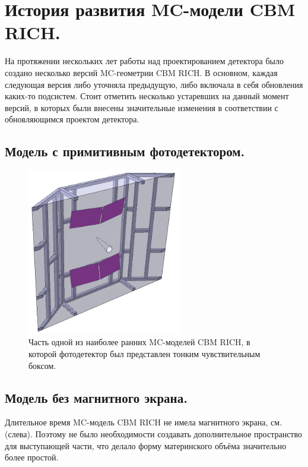 
\section{История развития MC-модели CBM RICH.}

На протяжении нескольких лет работы над проектированием детектора было создано несколько версий MC-геометрии CBM RICH. В основном, каждая следующая версия либо уточняла предыдущую, либо включала в себя обновления каких-то подсистем. Стоит отметить несколько устаревших на данный момент версий, в которых были внесены значительные изменения в соответствии с обновляющимся проектом детектора.

\subsection{Модель с примитивным фотодетектором.}

\begin{figure}[H]
\centering
\includegraphics[width=0.6\textwidth]{pictures/PrimitivePhotodetector.png}
\caption{Часть одной из наиболее ранних MC-моделей CBM RICH, в которой фотодетектор был представлен тонким чувствительным боксом.}
\label{fig:PrimitivePhotodetector}
\end{figure}

\subsection{Модель без магнитного экрана.}

Длительное время MC-модель CBM RICH не имела магнитного экрана, см. (слева). Поэтому не было необходимости создавать дополнительное пространство для выступающей части, что делало форму материнского объёма значительно более простой.

